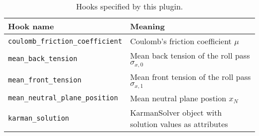 \documentclass[11pt]{PyRollDocs}
\begin{document}
    \begin{table}
        \centering
        \caption{Hooks specified by this plugin.}
        \label{tab:hookspecs}
        \begin{tabular}{ll}
            \toprule
            Hook name                               & Meaning                                                \\
            \midrule
            \texttt{coulomb\_friction\_coefficient} & Coulomb's friction coefficient $\mu$                   \\
            \texttt{mean\_back\_tension}            & Mean back tension of the roll pass $\sigma_{x,0}$      \\
            \texttt{mean\_front\_tension}           & Mean front tension of the roll pass $\sigma_{x,1}$     \\
            \texttt{mean\_neutral\_plane\_position} & Mean neutral plane postion $x_N$                       \\
            \texttt{karman\_solution}               & KarmanSolver object with solution values as attributes \\
            \bottomrule
        \end{tabular}
    \end{table}

    \printbibliography
\end{document}
